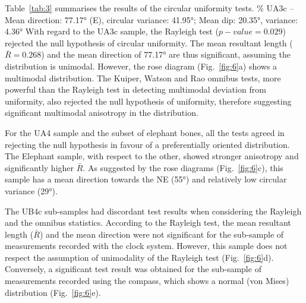 \documentclass[preprint,authoryear,times]{elsarticle} %
\begin{document}
Table~\ref{tab:3} summarises the results of the circular uniformity tests.
\% UA3c -- Mean direction: 77.17° (E), circular variance: 41.95°; Mean dip: 20.35°, variance: 4.36°
With regard to the UA3c sample, the Rayleigh test ($p-value=0.029$) rejected the null hypothesis of circular uniformity. The mean resultant length ($\bar{R}=0.268$) and the mean direction of 77.17° are thus significant, assuming the distribution is unimodal. However, the rose diagram (Fig.~\ref{fig:6}a) shows a multimodal distribution. The Kuiper, Watson and Rao omnibus tests, more powerful than the Rayleigh test in detecting multimodal deviation from uniformity, also rejected the null hypothesis of uniformity, therefore suggesting significant multimodal anisotropy in the distribution.

For the UA4 sample and the subset of elephant bones, all the tests agreed in rejecting the null hypothesis in favour of a preferentially oriented distribution. The Elephant sample, with respect to the other, showed stronger anisotropy and significantly higher $\bar{R}$. As suggested by the rose diagrams (Fig.~\ref{fig:6}c), this sample has a mean direction towards the NE (55°) and relatively low circular variance (29°).

The UB4c sub-samples had discordant test results when considering the Rayleigh and the omnibus statistics. According to the Rayleigh test, the mean resultant length ($\bar{R}$) and the mean direction were not significant for the sub-sample of measurements recorded with the clock system. However, this sample does not respect the assumption of unimodality of the Rayleigh test (Fig.~\ref{fig:6}d). Conversely, a significant test result was obtained for the sub-sample of measurements recorded using the compass, which shows a normal (von Mises) distribution (Fig.~\ref{fig:6}e). %
\end{document}
